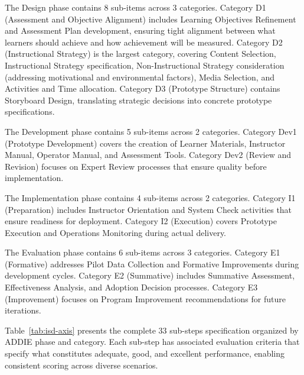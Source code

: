 The Design phase contains 8 sub-items across 3 categories. Category D1 (Assessment and Objective Alignment) includes Learning Objectives Refinement and Assessment Plan development, ensuring tight alignment between what learners should achieve and how achievement will be measured. Category D2 (Instructional Strategy) is the largest category, covering Content Selection, Instructional Strategy specification, Non-Instructional Strategy consideration (addressing motivational and environmental factors), Media Selection, and Activities and Time allocation. Category D3 (Prototype Structure) contains Storyboard Design, translating strategic decisions into concrete prototype specifications.

The Development phase contains 5 sub-items across 2 categories. Category Dev1 (Prototype Development) covers the creation of Learner Materials, Instructor Manual, Operator Manual, and Assessment Tools. Category Dev2 (Review and Revision) focuses on Expert Review processes that ensure quality before implementation.

The Implementation phase contains 4 sub-items across 2 categories. Category I1 (Preparation) includes Instructor Orientation and System Check activities that ensure readiness for deployment. Category I2 (Execution) covers Prototype Execution and Operations Monitoring during actual delivery.

The Evaluation phase contains 6 sub-items across 3 categories. Category E1 (Formative) addresses Pilot Data Collection and Formative Improvements during development cycles. Category E2 (Summative) includes Summative Assessment, Effectiveness Analysis, and Adoption Decision processes. Category E3 (Improvement) focuses on Program Improvement recommendations for future iterations.

Table~\ref{tab:isd-axis} presents the complete 33 sub-steps specification organized by ADDIE phase and category. Each sub-step has associated evaluation criteria that specify what constitutes adequate, good, and excellent performance, enabling consistent scoring across diverse scenarios.

